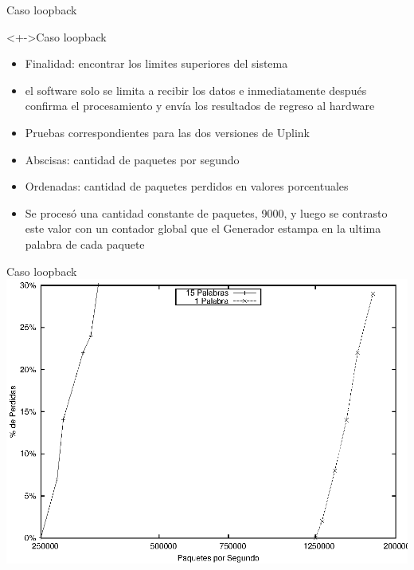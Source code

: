 \documentclass[xcolor=dvipsnames]{beamer}
\begin{document}
\begin{frame}{Caso loopback} 
\begin{block}<+->{Caso loopback}   
    \begin{itemize}
      \scriptsize
     	\item Finalidad: encontrar los limites superiores del sistema
     	\item el software solo se limita a recibir los datos e inmediatamente después confirma el procesamiento y envía los resultados de regreso al hardware
	\item Pruebas correspondientes para las dos versiones de Uplink
	\item Abscisas: cantidad de paquetes por segundo
	\item Ordenadas: cantidad de paquetes perdidos en valores porcentuales
	\item Se procesó una cantidad constante de paquetes, 9000, y luego se contrasto este valor con un contador global que el Generador estampa en la ultima palabra de cada paquete
    \end{itemize}
  \end{block}
\end{frame}

\begin{frame}{Caso loopback} 
\center	
\includegraphics[scale=0.70]{figures/loop.eps} 
\end{frame}
\end{document}
